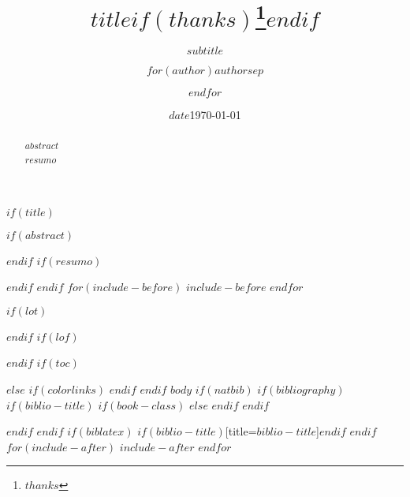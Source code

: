 \documentclass[$if(fontsize)$$fontsize$,$endif$$if(lang)$$babel-lang$,$endif$$if(papersize)$$papersize$paper,$endif$$for(classoption)$$classoption$$sep$,$endfor$]{$documentclass$}
\title{$title$$if(thanks)$\thanks{$thanks$}$endif$}
\subtitle{$subtitle$}
\author{$for(author)$$author$$sep$ \and $endfor$}
\institute{$institute$}
\date{$date$}
\date{\today}
\begin{document}
$if(title)$
\maketitle
% 
% 
$if(abstract)$
\begin{abstract}
$abstract$
\end{abstract}
$endif$
$if(resumo)$
\renewcommand{\abstractname}{Resumo}
\begin{abstract}
$resumo$
\end{abstract}
$endif$
$endif$
$for(include-before)$
$include-before$
$endfor$

$if(lot)$
\listoftables
$endif$
$if(lof)$
\hypertarget{sec:lof}{%
\listoffigures}
$endif$
$if(toc)$
\hypertarget{sec:toc}{%
\tableofcontents}
$else$
{
$if(colorlinks)$
\hypersetup{linkcolor=$if(toccolor)$$toccolor$$else$$endif$}
$endif$
\setcounter{tocdepth}{$toc-depth$}
\tableofcontents
}
$endif$
$body$
$if(natbib)$
$if(bibliography)$
$if(biblio-title)$
$if(book-class)$
\renewcommand\bibname{$biblio-title$}
$else$
\renewcommand\refname{$biblio-title$}
$endif$
$endif$

$endif$
$endif$
$if(biblatex)$
\printbibliography$if(biblio-title)$[title=$biblio-title$]$endif$
$endif$
$for(include-after)$
$include-after$
$endfor$
\end{document}
